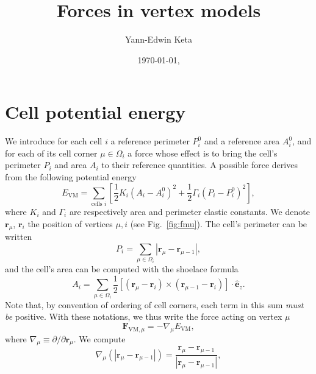 \documentclass[aps, superscriptaddress, notitlepage, longbibliography]{revtex4-1}
\begin{document}

\title{Forces in vertex models}
\author{Yann-Edwin Keta}
\date{\today, \currenttime}
\maketitle


\section{Cell potential energy}

We introduce for each cell $i$ a reference perimeter $P^0_i$ and a reference area $A^0_i$, and for each of its cell corner $\mu \in \Omega_i$ a force whose effect is to bring the cell's perimeter $P_i$ and area $A_i$ to their reference quantities. A possible force derives from the following potential energy \cite{farhadifar2007influence,fletcher2014vertex,bi2016motilitydriven,sknepnek2023generating}
\begin{equation}
E_{\mathrm{VM}} = \sum_{\text{cells } i} \left[\frac{1}{2} K_i (A_i - A_i^0)^2 + \frac{1}{2} \Gamma_i (P_i - P_i^0)^2\right],
\label{eq:evm}
\end{equation}
where $K_i$ and $\Gamma_i$ are respectively area and perimeter elastic constants. We denote $\boldsymbol{r}_{\mu}$, $\boldsymbol{r}_i$ the position of vertices $\mu, i$ (see Fig.~\ref{fig:fmu}). The cell's perimeter can be written
\begin{equation}
P_i = \sum_{\mu \in \Omega_i} |\boldsymbol{r}_{\mu} - \boldsymbol{r}_{\mu - 1}|,
\end{equation}
and the cell's area can be computed with the shoelace formula
\begin{equation}
A_i = \sum_{\mu \in \Omega_i} \frac{1}{2} [(\boldsymbol{r}_{\mu} - \boldsymbol{r}_{i}) \times (\boldsymbol{r}_{\mu - 1} - \boldsymbol{r}_{i})] \cdot \hat{\boldsymbol{e}}_z.
\end{equation}
Note that, by convention of ordering of cell corners, each term in this sum \textit{must be} positive. With these notations, we thus write the force acting on vertex $\mu$
\begin{equation}
\boldsymbol{F}_{\mathrm{VM},\mu} = -\nabla_{\mu} E_{\mathrm{VM}},
\label{eq:fmugrade}
\end{equation}
where $\nabla_{\mu} \equiv \partial/\partial \boldsymbol{r}_{\mu}$. We compute
\begin{equation}
\nabla_{\mu} \left(|\boldsymbol{r}_{\mu} - \boldsymbol{r}_{\mu - 1}|\right) = \frac{\boldsymbol{r}_{\mu} - \boldsymbol{r}_{\mu - 1}}{|\boldsymbol{r}_{\mu} - \boldsymbol{r}_{\mu - 1}|},
\end{equation}
\end{document}
